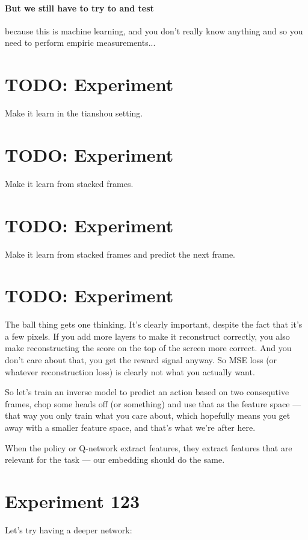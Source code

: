 \documentclass{article}
\begin{document}
\paragraph{But we still have to try to and test} because this is machine learning,
and you don't really know anything and so you need to perform empiric measurements...


\section{TODO: Experiment}
Make it learn in the tianshou setting.

\section{TODO: Experiment}
Make it learn from stacked frames.


\section{TODO: Experiment}
Make it learn from stacked frames and predict the next frame.

\section{TODO: Experiment}
The ball thing gets one thinking.
It's clearly important, despite the fact that it's a few pixels.
If you add more layers to make it reconstruct correctly, 
you also make reconstructing the score on the top of the screen more correct. 
And you don't care about that, you get the reward signal anyway.
So MSE loss (or whatever reconstruction loss) is clearly not what you actually want.

So let's train an inverse model to predict an action based on two consequtive frames,
chop some heads off (or something) and use that as the feature space --- 
that way you only train what you care about, which hopefully
means you get away with a smaller feature space,
and that's what we're after here.

When the policy or Q-network extract features, they extract features that are relevant 
for the task --- our embedding should do the same.

\section{Experiment 123}
Let's try having a deeper network:
\end{document}
